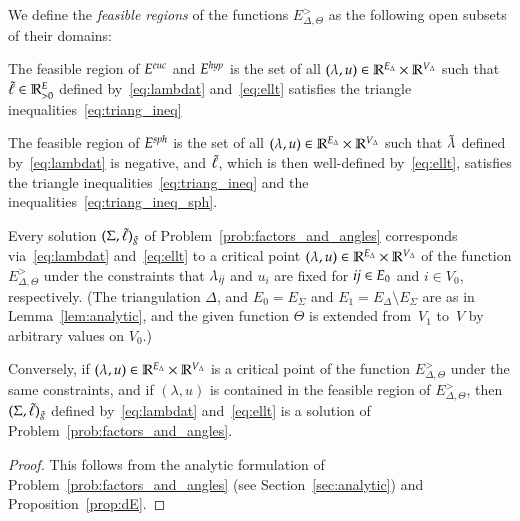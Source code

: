 \documentclass[Thesis]{subfiles}
\begin{document}
\begin{definition}
  We define the \emph{feasible regions}\/ of the functions
  $E_{\Delta,\Theta}^{\gt}$ as the following open subsets of their
  domains:
  \begin{compactitem}[$\bullet$]
  \item The feasible region of $E^{\euc}$ and $E^{\mathit{hyp}}$ is the set of
    all $(\lambda, u)\in\mathbb R^{E_{\Delta}}\times\mathbb R^{V_{\Delta}}$ such
    that $\tilde{\ell}\in\mathbb R_{>0}^{E}$ defined by~\eqref{eq:lambdat}
    and~\eqref{eq:ellt} satisfies the triangle
    inequalities~\eqref{eq:triang_ineq}
  \item The feasible region of $E^{\mathit{sph}}$ is the set of all $(\lambda,
    u)\in\mathbb R^{E_{\Delta}}\times\mathbb R^{V_{\Delta}}$ such that $\tilde{\lambda}$
    defined by~\eqref{eq:lambdat} is negative, and $\tilde{\ell}$, which is
    then well-defined by~\eqref{eq:ellt}, satisfies the triangle
    inequalities~\eqref{eq:triang_ineq} and the
    inequalities~\eqref{eq:triang_ineq_sph}.  
  \end{compactitem}
\end{definition}

\begin{theorem}
  \label{thm:variational}
  Every solution $(\Sigma,\tilde{\ell})_{\tilde{g}}$ of
  Problem~\ref{prob:factors_and_angles} corresponds
  via~\eqref{eq:lambdat} and~\eqref{eq:ellt} to a critical point\/
  $(\lambda, u)\in\mathbb R^{E_{\Delta}}\times\mathbb R^{V_{\Delta}}$ of the
  function $E^{\gt}_{\Delta,\Theta}$ under the constraints that
  $\lambda_{\it ij}$ and $u_{i}$ are fixed for ${\it ij}\in E_{0}$ and
  $i\in V_{0}$, respectively. (The triangulation $\Delta$, and
  $E_{0}=E_{\Sigma}$ and $E_{1}=E_{\Delta}\setminus E_{\Sigma}$ are as
  in Lemma~\ref{lem:analytic}, and the given function $\Theta$ is
  extended from~$V_{1}$ to~$V$ by arbitrary values on $V_{0}$.)

  Conversely, if\/ $(\lambda,
  u)\in\mathbb R^{E_{\Delta}}\times\mathbb R^{V_{\Delta}}$ is a critical point of
  the function $E^{\gt}_{\Delta,\Theta}$ under the same constraints,
  and if\/ $(\lambda, u)$ is contained in the feasible region of
  $E^{\gt}_{\Delta,\Theta}$, then\/ $(\Sigma,\tilde{\ell})_{\tilde{g}}$ defined
  by~\eqref{eq:lambdat} and~\eqref{eq:ellt} is a solution of
  Problem~\ref{prob:factors_and_angles}.
\end{theorem}

\begin{proof}
  This follows from the analytic formulation of
  Problem~\ref{prob:factors_and_angles} (see Section~\ref{sec:analytic}) and
  Proposition~\ref{prop:dE}.
\end{proof}
\end{document}
